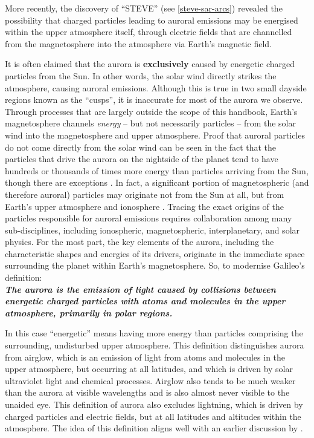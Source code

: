 \documentclass{article}
\renewcommand{\cite}[1]{\parencite{#1}}
\begin{document}
More recently, the discovery of ``STEVE'' (see \ref{steve-sar-arcs}) \cite{MacDonald2018} revealed the possibility that charged particles leading to auroral emissions may be energised within the upper atmosphere itself, through electric fields that are channelled from the magnetosphere into the atmosphere via Earth's magnetic field.

It is often claimed that the aurora is \textbf{exclusively} caused by energetic charged particles from the Sun. In other words, the solar wind directly strikes the atmosphere, causing auroral emissions. Although this is true in two small dayside regions known as the ``cusps'',  it is inaccurate for most of the aurora we observe. Through processes that are largely outside the scope of this handbook, Earth's magnetosphere channels {\it energy} -- but not necessarily particles -- from the solar wind into the magnetosphere and upper atmosphere.   
Proof that auroral particles do not come directly from the solar wind can be seen in the fact that the particles that drive the aurora on the nightside of the planet tend to have hundreds or thousands of times more energy than particles arriving from the Sun, though there are exceptions \cite{Hosokawa2024}. In fact, a significant portion of magnetospheric (and therefore auroral) particles may originate not from the Sun at all, but from Earth's upper atmosphere and ionosphere \cite{Chappell1987}. Tracing the exact origins of the particles responsible for auroral emissions requires collaboration among many sub-disciplines, including ionospheric, magnetospheric, interplanetary, and solar physics. For the most part, the key elements of the aurora, including the characteristic shapes and energies of its drivers, originate in the immediate space surrounding the planet within Earth's magnetosphere. 
So, to modernise Galileo's definition: \\
\newline
\textbf{\textit{The aurora is the emission of light caused by collisions between energetic charged particles with atoms and molecules in the upper atmosphere, primarily in polar regions.}}   %
\newline

In this case ``energetic'' means having more energy than particles comprising the surrounding, undisturbed upper atmosphere. This definition distinguishes aurora from airglow, which is an emission of light from atoms and molecules in the upper atmosphere, but occurring at all latitudes, and which is driven by solar ultraviolet light and chemical processes. Airglow also tends to be much weaker than the aurora at visible wavelengths and is also almost never visible to the unaided eye. This definition of aurora also excludes lightning, which is driven by charged particles and electric fields, but at all latitudes and altitudes within the atmosphere. The idea of this definition aligns well with an earlier discussion by \textcite{clarke2004}.
\end{document}
